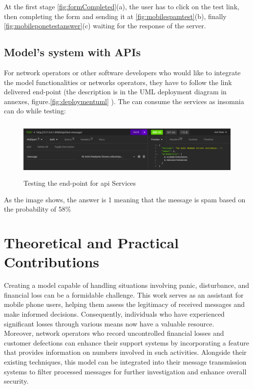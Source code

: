 \documentclass[12pt,a4paper, oneside]{book}
\begin{document}
At the first stage \ref{fig:formCompleted}(a), the user has to click on the test link, then completing the form and sending it  at \ref{fig:mobilespamtest}(b), finally \ref{fig:mobileponetestanswer}(c) waiting for the response of the server.

\subsection{Model's system with APIs}
For network operators or other software developers  who would like to integrate the model functionalities or networks operators,  they have to follow the link delivered end-point (the description is in the UML deployment diagram in annexes, figure.\ref{fig:deploymentuml}  ). The can consume the services as insomnia can do while testing:
\begin{figure}[h]
	\centering
	\includegraphics[width=15.8cm, height=2.9cm]{CollectImages/insomniaTest}
	\caption{Testing the end-point for api Services}
	\label{fig:insomniatest}
\end{figure} 
As the image shows, the answer is 1 meaning that the message is spam based on the probability of 58\%

\section{Theoretical and Practical Contributions}
Creating a model capable of handling situations involving panic, disturbance, and financial loss can be a formidable challenge. This work serves as an assistant for mobile phone users, helping them assess the legitimacy of received messages and make informed decisions. Consequently, individuals who have experienced significant losses through various means now have a valuable resource.\\

Moreover, network operators who record uncontrolled financial losses and customer defections can enhance their support systems by incorporating a feature that provides information on numbers involved in such activities. Alongside their existing techniques, this model can be integrated into their message transmission systems to filter processed messages for further investigation and enhance overall security.\\
\end{document}

